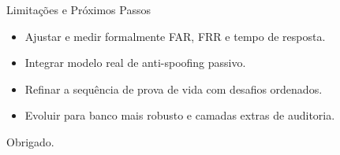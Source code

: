 \documentclass[aspectratio=169,11pt]{beamer}
\begin{document}
\begin{frame}{Limita\c{c}\~oes e Pr\'oximos Passos}
  \begin{itemize}
    \item Ajustar e medir formalmente FAR, FRR e tempo de resposta.
    \item Integrar modelo real de anti-spoofing passivo.
    \item Refinar a sequ\^encia de prova de vida com desafios ordenados.
    \item Evoluir para banco mais robusto e camadas extras de auditoria.
  \end{itemize}

  \vspace{0.5cm}
  \centering
  \Large Obrigado.
\end{frame}
\end{document}
